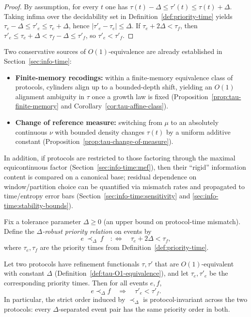 \begin{proof}
By assumption, for every $t$ one has $\tau(t)-\Delta\le \tau'(t)\le \tau(t)+\Delta$.
Taking infima over the decidability set in Definition~\ref{def:priority-time} yields $\tau_e-\Delta\le \tau'_e\le \tau_e+\Delta$, hence $|\tau'_e-\tau_e|\le \Delta$.
If $\tau_e+2\Delta<\tau_f$, then $\tau'_e\le \tau_e+\Delta<\tau_f-\Delta\le \tau'_f$, so $\tau'_e<\tau'_f$.
\end{proof}

\begin{remark}
Two conservative sources of $O(1)$-equivalence are already established in Section~\ref{sec:info-time}:
\begin{itemize}[leftmargin=*,itemsep=2pt]
  \item \textbf{Finite-memory recodings:} within a finite-memory equivalence class of protocols, cylinders align up to a bounded-depth shift, yielding an $O(1)$ alignment ambiguity in $\tau$ once a growth law is fixed (Proposition~\ref{prop:tau-finite-memory} and Corollary~\ref{cor:tau-affine-class}).
  \item \textbf{Change of reference measure:} switching from $\mu$ to an absolutely continuous $\nu$ with bounded density changes $\tau(t)$ by a uniform additive constant (Proposition~\ref{prop:tau-change-of-measure}).
\end{itemize}
In addition, if protocols are restricted to those factoring through the maximal equicontinuous factor (Section~\ref{sec:info-time:mef}), then their ``rigid'' information content is compared on a canonical base; residual dependence on window/partition choice can be quantified via mismatch rates and propagated to time/entropy error bars (Section~\ref{sec:info-time:sensitivity} and \ref{sec:info-time:stability-bounds}).
\end{remark}

\begin{definition}\label{def:robust-priority}
Fix a tolerance parameter $\Delta\ge 0$ (an upper bound on protocol-time mismatch). Define the \emph{$\Delta$-robust priority relation} on events by
\[
e\ \prec_{\Delta}\ f
\quad:\Longleftrightarrow\quad
\tau_e + 2\Delta < \tau_f,
\]
where $\tau_e,\tau_f$ are the priority times from Definition~\ref{def:priority-time}.
\end{definition}

\begin{proposition}\label{prop:robust-priority-invariant}
Let two protocols have refinement functionals $\tau,\tau'$ that are $O(1)$-equivalent with constant $\Delta$ (Definition~\ref{def:tau-O1-equivalence}), and let $\tau_e,\tau'_e$ be the corresponding priority times. Then for all events $e,f$,
\[
e\prec_{\Delta} f
\quad\Longrightarrow\quad
\tau'_e<\tau'_f.
\]
In particular, the strict order induced by $\prec_\Delta$ is protocol-invariant across the two protocols: every $\Delta$-separated event pair has the same priority order in both.
\end{proposition}

